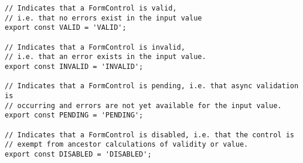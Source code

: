 \begin{verbatim}
// Indicates that a FormControl is valid,
// i.e. that no errors exist in the input value
export const VALID = 'VALID';

// Indicates that a FormControl is invalid,
// i.e. that an error exists in the input value.
export const INVALID = 'INVALID';

// Indicates that a FormControl is pending, i.e. that async validation is
// occurring and errors are not yet available for the input value.
export const PENDING = 'PENDING';

// Indicates that a FormControl is disabled, i.e. that the control is
// exempt from ancestor calculations of validity or value.
export const DISABLED = 'DISABLED';
\end{verbatim}
